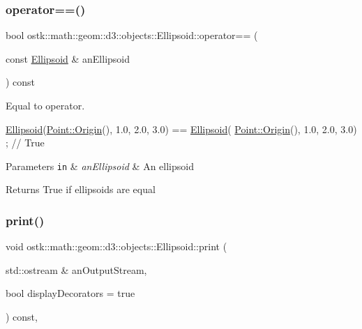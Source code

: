 \subsubsection{\texorpdfstring{operator==()}{operator==()}}
{\footnotesize\ttfamily bool ostk\+::math\+::geom\+::d3\+::objects\+::\+Ellipsoid\+::operator== (\begin{DoxyParamCaption}\item[{const \hyperlink{classostk_1_1math_1_1geom_1_1d3_1_1objects_1_1_ellipsoid}{Ellipsoid} \&}]{an\+Ellipsoid }\end{DoxyParamCaption}) const}



Equal to operator. 


\begin{DoxyCode}
\hyperlink{classostk_1_1math_1_1geom_1_1d3_1_1objects_1_1_ellipsoid_a106c71abf9503f3d06b2613c1c7e9d65}{Ellipsoid}(\hyperlink{classostk_1_1math_1_1geom_1_1d3_1_1objects_1_1_point_a079c199f08b015d456d02728a71b534c}{Point::Origin}(), 1.0, 2.0, 3.0) == \hyperlink{classostk_1_1math_1_1geom_1_1d3_1_1objects_1_1_ellipsoid_a106c71abf9503f3d06b2613c1c7e9d65}{Ellipsoid}(
      \hyperlink{classostk_1_1math_1_1geom_1_1d3_1_1objects_1_1_point_a079c199f08b015d456d02728a71b534c}{Point::Origin}(), 1.0, 2.0, 3.0) ; \textcolor{comment}{// True}
\end{DoxyCode}



\begin{DoxyParams}[1]{Parameters}
\mbox{\tt in}  & {\em an\+Ellipsoid} & An ellipsoid \\
\hline
\end{DoxyParams}
\begin{DoxyReturn}{Returns}
True if ellipsoids are equal 
\end{DoxyReturn}
\mbox{\label{classostk_1_1math_1_1geom_1_1d3_1_1objects_1_1_ellipsoid_a650fa20181d61ea455b98fc3330baf6e}} 
\subsubsection{\texorpdfstring{print()}{print()}}
{\footnotesize\ttfamily void ostk\+::math\+::geom\+::d3\+::objects\+::\+Ellipsoid\+::print (\begin{DoxyParamCaption}\item[{std\+::ostream \&}]{an\+Output\+Stream,  }\item[{bool}]{display\+Decorators = {\ttfamily true} }\end{DoxyParamCaption}) const\hspace{0.3cm}{\ttfamily [override]}, {\ttfamily [virtual]}}



